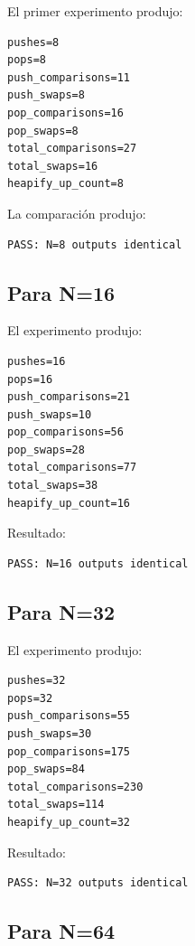 \documentclass[11pt,a4paper]{article}
\begin{document}
El primer experimento produjo:

\begin{lstlisting}[style=textfile]
pushes=8
pops=8
push_comparisons=11
push_swaps=8
pop_comparisons=16
pop_swaps=8
total_comparisons=27
total_swaps=16
heapify_up_count=8
\end{lstlisting}

La comparación produjo:

\begin{lstlisting}[style=textfile]
PASS: N=8 outputs identical
\end{lstlisting}

\subsection{Para N=16}

El experimento produjo:

\begin{lstlisting}[style=textfile]
pushes=16
pops=16
push_comparisons=21
push_swaps=10
pop_comparisons=56
pop_swaps=28
total_comparisons=77
total_swaps=38
heapify_up_count=16
\end{lstlisting}

Resultado:

\begin{lstlisting}[style=textfile]
PASS: N=16 outputs identical
\end{lstlisting}

\subsection{Para N=32}

El experimento produjo:

\begin{lstlisting}[style=textfile]
pushes=32
pops=32
push_comparisons=55
push_swaps=30
pop_comparisons=175
pop_swaps=84
total_comparisons=230
total_swaps=114
heapify_up_count=32
\end{lstlisting}

Resultado:

\begin{lstlisting}[style=textfile]
PASS: N=32 outputs identical
\end{lstlisting}

\subsection{Para N=64}
\end{document}

